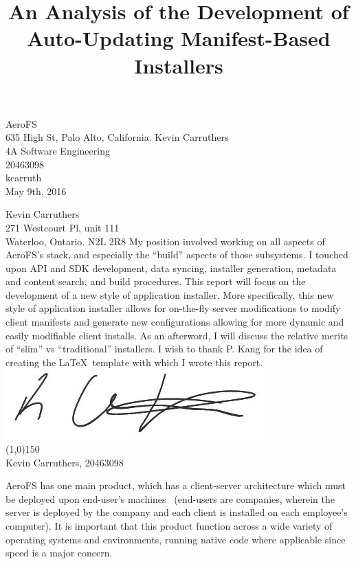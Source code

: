 \documentclass[12pt]{article}
\begin{document}
\title{An Analysis of the Development of Auto-Updating Manifest-Based Installers}
{
    AeroFS\\
    635 High St, Palo Alto, California.
}
{
    Kevin Carruthers\\
    4A Software Engineering\\
    20463098\\
    kcarruth\\
    May 9th, 2016
}


{
    \noindent
    Kevin Carruthers\\
    271 Westcourt Pl, unit 111\\
    Waterloo, Ontario. N2L 2R8
}
{
    My position involved working on all aspects of AeroFS's stack, and especially the ``build'' aspects of those subsystems. I touched upon API and SDK development, data syncing, installer generation, metadata and content search, and build procedures.
}
{
    This report will focus on the development of a new style of application installer. More specifically, this new style of application installer allows for on-the-fly server modifications to modify client manifests and generate new configurations allowing for more dynamic and easily modifiable client installs. As an afterword, I will discuss the relative merits of ``slim'' vs ``traditional'' installers.
}
{
    I wish to thank P. Kang for the idea of creating the \LaTeX\ template with which I wrote this report.
}
{
    \includegraphics[scale=0.4]{signature.jpg}\\
    \line(1,0){150}\\
    Kevin Carruthers, 20463098
}


AeroFS has one main product, which has a client-server architecture which must be deployed upon end-user's machines~\cite{aerofs} (end-users are companies, wherein the server is deployed by the company and each client is installed on each employee's computer). It is important that this product function across a wide variety of operating systems and environments, running native code where applicable since speed is a major concern.
\end{document}
